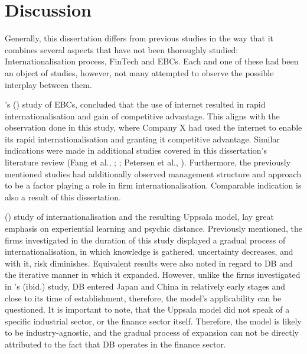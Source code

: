 \documentclass[11pt,a4paper]{article}
\begin{document}
{{{	
\newpage

\section{Discussion}
\vspace{-2mm}
\label{discussion}
\frenchspacing
{} \par %
Generally, this dissertation differs from previous studies in the way that it combines several aspects that have not been thoroughly studied: Internationalisation process, FinTech and EBCs. Each and one of these had been an object of studies, however, not many attempted to observe the possible interplay between them. \par
\citeauthor{loaneCrossnationalComparisonInternationalisation2002}'s (\citeyear{loaneCrossnationalComparisonInternationalisation2002}) study of EBCs, concluded that the use of internet resulted in rapid internationalisation and gain of competitive advantage. This aligns with the observation done in this study, where Company X had used the internet to enable its rapid internationalisation and granting it competitive advantage. Similar indications were made in additional studies covered in this dissertation's literature review (Fang et al., \citeyear{fangParachutingInternationalizationStudy2017}; \cite{terziImpactEcommerceInternational2011}; Petersen et al., \citeyear{petersenInternetForeignMarket2002}). Furthermore, the previously mentioned studies had additionally observed management structure and approach to be a factor playing a role in firm internationalisation. Comparable indication is also a result of this dissertation.  \par
\citeauthor{johansonInternationalizationProcessFirm1977} (\citeyear{johansonInternationalizationProcessFirm1977}) study of internationalisation and the resulting Uppsala model, lay great emphasis on experiential learning and psychic distance. Previously mentioned, the firms investigated in the duration of this study displayed a gradual process of internationalisation, in which knowledge is gathered, uncertainty decreases, and with it, risk diminishes. Equivalent results were also noted in regard to DB and the iterative manner in which it expanded. However, unlike the firms investigated in \citeauthor{johansonInternationalizationProcessFirm1977}'s (ibid.) study, DB entered Japan and China in relatively early stages and close to its time of establishment, therefore, the model's applicability can be questioned. It is important to note, that the Uppsala model did not speak of a specific industrial sector, or the finance sector itself. Therefore, the model is likely to be industry-agnostic, and the gradual process of expansion can not be directly attributed to the fact that DB operates in the finance sector. \par
}}}
\end{document}

